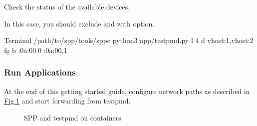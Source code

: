 \documentclass[a4paper,11pt,openany,oneside,english]{sphinxmanual}
\begin{document}
\begin{sphinxVerbatim}[commandchars=\\\{\},formatcom=\footnotesize]
 Check the status of the available devices.

\end{sphinxVerbatim}

In this case, you should exclude  and 
with  option.

\begin{sphinxVerbatim}[commandchars=\\\{\},formatcom=\footnotesize]
 Terminal 
  /path/to/spp/tools/sppc
 python3 app/testpmd.py \PYGZhy{}l \PYGZhy{}4 
  \PYGZhy{}d vhost:1,vhost:2 
  \PYGZhy{}fg 
  \PYGZhy{}b :0a:00.0 :0a:00.1
\end{sphinxVerbatim}


\subsubsection{Run Applications}
\label{\detokenize{tools/sppc/getting_started:run-applications}}\label{\detokenize{tools/sppc/getting_started:sppc-gs-run-apps}}
At the end of this getting started guide, configure network paths
as described in
\hyperref[\detokenize{tools/sppc/getting_started:figure-sppc-gsg-testpmd}]{Fig.\@ \ref{\detokenize{tools/sppc/getting_started:figure-sppc-gsg-testpmd}}}
and start forwarding from testpmd.

\begin{figure}[htbp]
\centering
\capstart

\noindent{}
\caption{SPP and testpmd on containers}\label{\detokenize{tools/sppc/getting_started:id1}}\label{\detokenize{tools/sppc/getting_started:figure-sppc-gsg-testpmd}}\end{figure}
\end{document}
